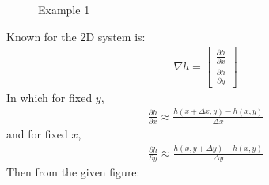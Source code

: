 \documentclass[letterpaper,10pt,english]{jupyterBook}
\begin{document}
\begin{figure}[htbp]
\centering
\capstart

\noindent{}
\caption{Example 1}\label{\detokenize{content/flow/L6/16_darcy_law_3D:ex-1}}\end{figure}

\sphinxAtStartPar
{}

\sphinxAtStartPar
Known for the 2D system is:
\begin{equation*}
\begin{split}
\nabla h = \begin{bmatrix} \frac{\partial h}{\partial x}
\\
\frac{\partial h}{\partial y} \end{bmatrix}
\end{split}
\end{equation*}
\sphinxAtStartPar
In which for fixed \(y\),
\begin{equation*}
\begin{split}
\frac{\partial h}{\partial x}\approx \frac{h(x+\Delta x, y)- h(x,y)}{\Delta x}
\end{split}
\end{equation*}
\sphinxAtStartPar
and for fixed \(x\),
\begin{equation*}
\begin{split}
\frac{\partial h}{\partial y}\approx \frac{h(x, y + \Delta y)- h(x,y)}{\Delta y}
\end{split}
\end{equation*}
\sphinxAtStartPar
Then from the given figure:
\end{document}
